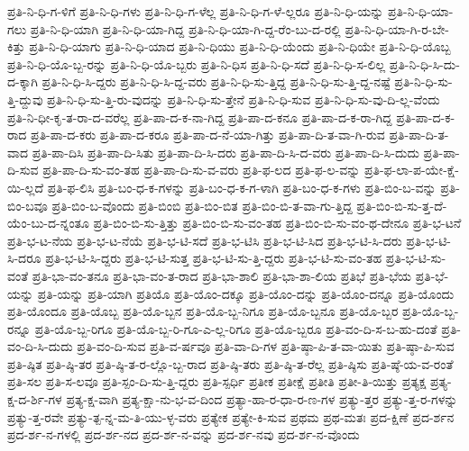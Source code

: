 {ಪ್ರತಿ-ನಿ-ಧಿ-ಗ-ಳಿಗೆ
ಪ್ರತಿ-ನಿ-ಧಿ-ಗಳು
ಪ್ರತಿ-ನಿ-ಧಿ-ಗ-ಳೆಲ್ಲ
ಪ್ರತಿ-ನಿ-ಧಿ-ಗ-ಳೆ-ಲ್ಲರೂ
ಪ್ರತಿ-ನಿ-ಧಿ-ಯನ್ನು
ಪ್ರತಿ-ನಿ-ಧಿ-ಯಾ-ಗಲು
ಪ್ರತಿ-ನಿ-ಧಿ-ಯಾಗಿ
ಪ್ರತಿ-ನಿ-ಧಿ-ಯಾ-ಗಿದ್ದ
ಪ್ರತಿ-ನಿ-ಧಿ-ಯಾ-ಗಿ-ದ್ದ-ರೆಂ-ಬು-ದ-ರಲ್ಲಿ
ಪ್ರತಿ-ನಿ-ಧಿ-ಯಾ-ಗಿ-ರ-ಬೇ-ಕಿತ್ತು
ಪ್ರತಿ-ನಿ-ಧಿ-ಯಾಗು
ಪ್ರತಿ-ನಿ-ಧಿ-ಯಾದ
ಪ್ರತಿ-ನಿ-ಧಿಯು
ಪ್ರತಿ-ನಿ-ಧಿ-ಯೆಂದು
ಪ್ರತಿ-ನಿ-ಧಿಯೇ
ಪ್ರತಿ-ನಿ-ಧಿ-ಯೊಬ್ಬ
ಪ್ರತಿ-ನಿ-ಧಿ-ಯೊ-ಬ್ಬ-ರನ್ನು
ಪ್ರತಿ-ನಿ-ಧಿ-ಯೊ-ಬ್ಬರು
ಪ್ರತಿ-ನಿ-ಧಿಸ
ಪ್ರತಿ-ನಿ-ಧಿ-ಸದೆ
ಪ್ರತಿ-ನಿ-ಧಿ-ಸ-ಲಿಲ್ಲ
ಪ್ರತಿ-ನಿ-ಧಿ-ಸಿ-ದು-ದ-ಕ್ಕಾಗಿ
ಪ್ರತಿ-ನಿ-ಧಿ-ಸಿ-ದ್ದರು
ಪ್ರತಿ-ನಿ-ಧಿ-ಸಿ-ದ್ದ-ವರು
ಪ್ರತಿ-ನಿ-ಧಿ-ಸು-ತ್ತಿದ್ದ
ಪ್ರತಿ-ನಿ-ಧಿ-ಸು-ತ್ತಿ-ದ್ದ-ನಷ್ಟೆ
ಪ್ರತಿ-ನಿ-ಧಿ-ಸು-ತ್ತಿ-ದ್ದುವು
ಪ್ರತಿ-ನಿ-ಧಿ-ಸು-ತ್ತಿ-ರು-ವುದನ್ನು
ಪ್ರತಿ-ನಿ-ಧಿ-ಸು-ತ್ತೇನೆ
ಪ್ರತಿ-ನಿ-ಧಿ-ಸುವ
ಪ್ರತಿ-ನಿ-ಧಿ-ಸು-ವು-ದಿ-ಲ್ಲ-ವೆಂದು
ಪ್ರತಿ-ನಿ-ಧೀ-ಕೃ-ತ-ರಾ-ದ-ವರೆಲ್ಲ
ಪ್ರತಿ-ಪಾ-ದ-ಕ-ನಾ-ಗಿದ್ದ
ಪ್ರತಿ-ಪಾ-ದ-ಕನೂ
ಪ್ರತಿ-ಪಾ-ದ-ಕ-ರಾ-ಗಿದ್ದ
ಪ್ರತಿ-ಪಾ-ದ-ಕ-ರಾದ
ಪ್ರತಿ-ಪಾ-ದ-ಕರು
ಪ್ರತಿ-ಪಾ-ದ-ಕರೂ
ಪ್ರತಿ-ಪಾ-ದ-ನೆ-ಯಾ-ಗಿತ್ತು
ಪ್ರತಿ-ಪಾ-ದಿ-ತ-ವಾ-ಗಿ-ರುವ
ಪ್ರತಿ-ಪಾ-ದಿ-ತ-ವಾದ
ಪ್ರತಿ-ಪಾ-ದಿಸಿ
ಪ್ರತಿ-ಪಾ-ದಿ-ಸಿತು
ಪ್ರತಿ-ಪಾ-ದಿ-ಸಿ-ದರು
ಪ್ರತಿ-ಪಾ-ದಿ-ಸಿ-ದ-ವರು
ಪ್ರತಿ-ಪಾ-ದಿ-ಸಿ-ದುದು
ಪ್ರತಿ-ಪಾ-ದಿ-ಸುವ
ಪ್ರತಿ-ಪಾ-ದಿ-ಸು-ವಂ-ತಹ
ಪ್ರತಿ-ಪಾ-ದಿ-ಸು-ವ-ವರು
ಪ್ರತಿ-ಫ-ಲದ
ಪ್ರತಿ-ಫ-ಲ-ವನ್ನು
ಪ್ರತಿ-ಫ-ಲಾ-ಪ-ಯೇ-ಕ್ಷೆ-ಯಿ-ಲ್ಲದೆ
ಪ್ರತಿ-ಫ-ಲಿಸಿ
ಪ್ರತಿ-ಬಂ-ಧ-ಕ-ಗಳನ್ನು
ಪ್ರತಿ-ಬಂ-ಧ-ಕ-ಗ-ಳಾಗಿ
ಪ್ರತಿ-ಬಂ-ಧ-ಕ-ಗಳು
ಪ್ರತಿ-ಬಿಂ-ಬ-ವನ್ನು
ಪ್ರತಿ-ಬಿಂ-ಬವೂ
ಪ್ರತಿ-ಬಿಂ-ಬ-ವೊಂದು
ಪ್ರತಿ-ಬಿಂಬಿ
ಪ್ರತಿ-ಬಿಂ-ಬಿತ
ಪ್ರತಿ-ಬಿಂ-ಬಿ-ತ-ವಾ-ಗು-ತ್ತಿದ್ದ
ಪ್ರತಿ-ಬಿಂ-ಬಿ-ಸು-ತ್ತ-ದೆ-ಯೆಂ-ಬು-ದ-ನ್ನಂತೂ
ಪ್ರತಿ-ಬಿಂ-ಬಿ-ಸು-ತ್ತಿತ್ತು
ಪ್ರತಿ-ಬಿಂ-ಬಿ-ಸು-ವಂ-ತಹ
ಪ್ರತಿ-ಬಿಂ-ಬಿ-ಸು-ವಂ-ಥ-ದೇನೂ
ಪ್ರತಿ-ಭ-ಟನೆ
ಪ್ರತಿ-ಭ-ಟ-ನೆಯ
ಪ್ರತಿ-ಭ-ಟ-ನೆಯೆ
ಪ್ರತಿ-ಭ-ಟಿ-ಸದೆ
ಪ್ರತಿ-ಭ-ಟಿಸಿ
ಪ್ರತಿ-ಭ-ಟಿ-ಸಿದ
ಪ್ರತಿ-ಭ-ಟಿ-ಸಿ-ದರು
ಪ್ರತಿ-ಭ-ಟಿ-ಸಿ-ದರೂ
ಪ್ರತಿ-ಭ-ಟಿ-ಸಿ-ದ್ದರು
ಪ್ರತಿ-ಭ-ಟಿ-ಸುತ್ತ
ಪ್ರತಿ-ಭ-ಟಿ-ಸು-ತ್ತಿ-ದ್ದರು
ಪ್ರತಿ-ಭ-ಟಿ-ಸು-ವಂ-ತಹ
ಪ್ರತಿ-ಭ-ಟಿ-ಸು-ವಂತೆ
ಪ್ರತಿ-ಭಾ-ವಂ-ತನೂ
ಪ್ರತಿ-ಭಾ-ವಂ-ತ-ರಾದ
ಪ್ರತಿ-ಭಾ-ಶಾಲಿ
ಪ್ರತಿ-ಭಾ-ಶಾ-ಲಿಯ
ಪ್ರತಿಭೆ
ಪ್ರತಿ-ಭೆಯ
ಪ್ರತಿ-ಭೆ-ಯನ್ನು
ಪ್ರತಿ-ಯನ್ನು
ಪ್ರತಿ-ಯಾಗಿ
ಪ್ರತಿಯೊ
ಪ್ರತಿ-ಯೊಂ-ದಕ್ಕೂ
ಪ್ರತಿ-ಯೊಂ-ದನ್ನು
ಪ್ರತಿ-ಯೊಂ-ದನ್ನೂ
ಪ್ರತಿ-ಯೊಂದು
ಪ್ರತಿ-ಯೊಂದೂ
ಪ್ರತಿ-ಯೊಬ್ಬ
ಪ್ರತಿ-ಯೊ-ಬ್ಬನ
ಪ್ರತಿ-ಯೊ-ಬ್ಬ-ನಿಗೂ
ಪ್ರತಿ-ಯೊ-ಬ್ಬನೂ
ಪ್ರತಿ-ಯೊ-ಬ್ಬರ
ಪ್ರತಿ-ಯೊ-ಬ್ಬ-ರನ್ನೂ
ಪ್ರತಿ-ಯೊ-ಬ್ಬ-ರಿಗೂ
ಪ್ರತಿ-ಯೊ-ಬ್ಬ-ರಿ-ಗೂ-ಎ-ಲ್ಲ-ರಿಗೂ
ಪ್ರತಿ-ಯೊ-ಬ್ಬರೂ
ಪ್ರತಿ-ವಂ-ದಿ-ಸ-ಬ-ಹು-ದಂತೆ
ಪ್ರತಿ-ವಂ-ದಿ-ಸಿ-ದುದು
ಪ್ರತಿ-ವಂ-ದಿ-ಸುವ
ಪ್ರತಿ-ವ-ರ್ಷವೂ
ಪ್ರತಿ-ವಾ-ದಿ-ಗಳ
ಪ್ರತಿ-ಷ್ಠಾ-ಪಿ-ತ-ವಾ-ಯಿತು
ಪ್ರತಿ-ಷ್ಠಾ-ಪಿ-ಸುವ
ಪ್ರತಿ-ಷ್ಠಿತ
ಪ್ರತಿ-ಷ್ಠಿ-ತರ
ಪ್ರತಿ-ಷ್ಠಿ-ತ-ರ-ಲ್ಲೊ-ಬ್ಬ-ರಾದ
ಪ್ರತಿ-ಷ್ಠಿ-ತರು
ಪ್ರತಿ-ಷ್ಠಿ-ತ-ರೆಲ್ಲ
ಪ್ರತಿ-ಷ್ಠಿಸು
ಪ್ರತಿ-ಷ್ಠೆ-ಯ-ವ-ರಂತೆ
ಪ್ರತಿ-ಸಲ
ಪ್ರತಿ-ಸ-ಲವೂ
ಪ್ರತಿ-ಸ್ಪಂ-ದಿ-ಸು-ತ್ತಿ-ದ್ದರು
ಪ್ರತಿ-ಸ್ಪರ್ಧಿ
ಪ್ರತೀಕ
ಪ್ರತೀಕ್ಷೆ
ಪ್ರತೀತಿ
ಪ್ರತೀ-ತಿ-ಯಿತ್ತು
ಪ್ರತ್ಯಕ್ಷ
ಪ್ರತ್ಯ-ಕ್ಷ-ದ-ರ್ಶಿ-ಗಳ
ಪ್ರತ್ಯ-ಕ್ಷ-ವಾಗಿ
ಪ್ರತ್ಯ-ಕ್ಷಾ-ನು-ಭ-ವ-ದಿಂದ
ಪ್ರತ್ಯಾ-ಹಾ-ರ-ಧಾ-ರ-ಣ-ಗಳ
ಪ್ರತ್ಯು-ತ್ತರ
ಪ್ರತ್ಯು-ತ್ತ-ರ-ಗಳನ್ನು
ಪ್ರತ್ಯು-ತ್ತ-ರವೇ
ಪ್ರತ್ಯು-ತ್ಪ-ನ್ನ-ಮ-ತಿ-ಯು-ಳ್ಳ-ವರು
ಪ್ರತ್ಯೇಕ
ಪ್ರತ್ಯೇ-ಕಿ-ಸುವ
ಪ್ರಥಮ
ಪ್ರಥ-ಮತಃ
ಪ್ರದ-ಕ್ಷಿಣೆ
ಪ್ರದ-ರ್ಶನ
ಪ್ರದ-ರ್ಶ-ನ-ಗಳಲ್ಲಿ
ಪ್ರದ-ರ್ಶ-ನದ
ಪ್ರದ-ರ್ಶ-ನ-ವನ್ನು
ಪ್ರದ-ರ್ಶ-ನವು
ಪ್ರದ-ರ್ಶ-ನ-ವೊಂದು
}

